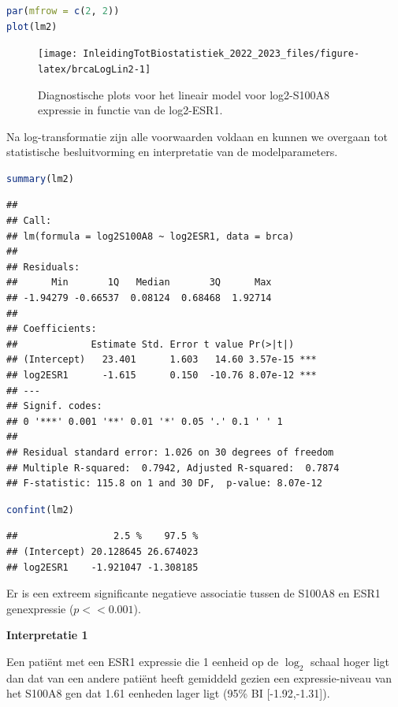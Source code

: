 \documentclass[
  12pt,dutch,coursenotes]{book}
\begin{document}
\begin{lstlisting}[language=R]
par(mfrow = c(2, 2))
plot(lm2)
\end{lstlisting}

\begin{figure}

{\centering \texttt{[image: InleidingTotBiostatistiek\_2022\_2023\_files/figure-latex/brcaLogLin2-1]} 

}

\caption{Diagnostische plots voor het lineair model voor log2-S100A8 expressie in functie van de log2-ESR1.}\label{fig:brcaLogLin2}
\end{figure}

Na log-transformatie zijn alle voorwaarden voldaan en kunnen we overgaan tot statistische besluitvorming en interpretatie van de modelparameters.

\begin{lstlisting}[language=R]
summary(lm2)
\end{lstlisting}

\begin{lstlisting}
## 
## Call:
## lm(formula = log2S100A8 ~ log2ESR1, data = brca)
## 
## Residuals:
##      Min       1Q   Median       3Q      Max 
## -1.94279 -0.66537  0.08124  0.68468  1.92714 
## 
## Coefficients:
##             Estimate Std. Error t value Pr(>|t|)    
## (Intercept)   23.401      1.603   14.60 3.57e-15 ***
## log2ESR1      -1.615      0.150  -10.76 8.07e-12 ***
## ---
## Signif. codes:  
## 0 '***' 0.001 '**' 0.01 '*' 0.05 '.' 0.1 ' ' 1
## 
## Residual standard error: 1.026 on 30 degrees of freedom
## Multiple R-squared:  0.7942, Adjusted R-squared:  0.7874 
## F-statistic: 115.8 on 1 and 30 DF,  p-value: 8.07e-12
\end{lstlisting}

\begin{lstlisting}[language=R]
confint(lm2)
\end{lstlisting}

\begin{lstlisting}
##                 2.5 %    97.5 %
## (Intercept) 20.128645 26.674023
## log2ESR1    -1.921047 -1.308185
\end{lstlisting}

Er is een extreem significante negatieve associatie tussen de S100A8 en ESR1 genexpressie (\(p<<0.001\)).

\textbf{Interpretatie 1}

Een patiënt met een ESR1 expressie die 1 eenheid op de \(\log_2\) schaal hoger ligt dan dat van een andere patiënt heeft gemiddeld gezien een expressie-niveau van het S100A8 gen dat 1.61 eenheden lager ligt (95\% BI {[}-1.92,-1.31{]}).
\end{document}
